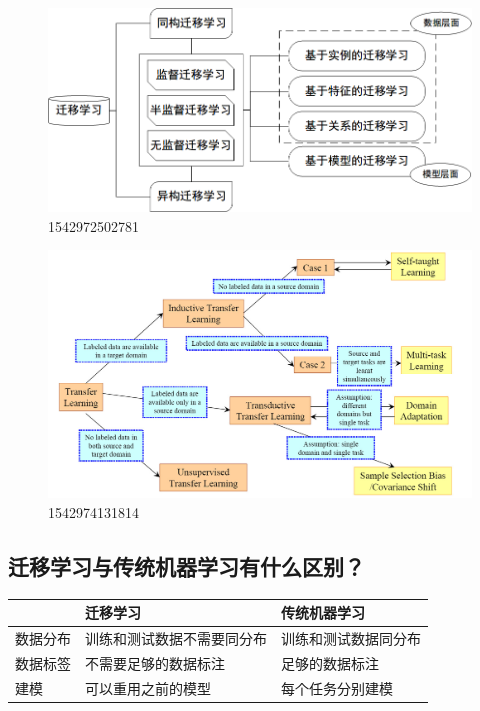 \begin{figure}
\centering
\includegraphics{./img/ch11/1542972502781.png}
\caption{1542972502781}
\end{figure}

\begin{figure}
\centering
\includegraphics{./img/ch11/1542974131814.png}
\caption{1542974131814}
\end{figure}

\subsection{迁移学习与传统机器学习有什么区别？}\label{ux8fc1ux79fbux5b66ux4e60ux4e0eux4f20ux7edfux673aux5668ux5b66ux4e60ux6709ux4ec0ux4e48ux533aux522b}

\begin{longtable}[]{@{}lll@{}}
\toprule
& 迁移学习 & 传统机器学习\tabularnewline
\midrule
\endhead
数据分布 & 训练和测试数据不需要同分布 &
训练和测试数据同分布\tabularnewline
数据标签 & 不需要足够的数据标注 & 足够的数据标注\tabularnewline
建模 & 可以重用之前的模型 & 每个任务分别建模\tabularnewline
\bottomrule
\end{longtable}

